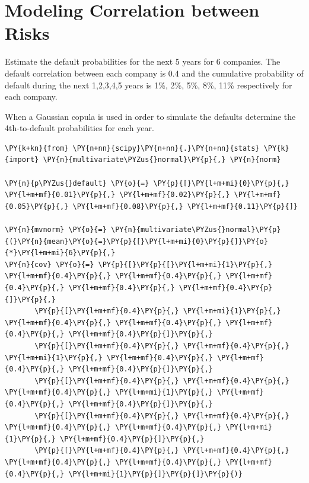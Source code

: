 \chapter{Modeling Correlation between Risks}\label{introduction-to-python---lesson-12}

\begin{Exercise}[title={($n^{th}$ to Default)}]
Estimate the default probabilities for the next 5 years for 6 companies. 
The default correlation between each company is 0.4 and the cumulative probability of default during 
the next 1,2,3,4,5 years is 1\%, 2\%, 5\%, 8\%, 11\% respectively for each company.

When a Gaussian copula is used in order to simulate the defaults determine the 4th-to-default probabilities for each year.
\end{Exercise}
\begin{Answer}
\begin{tcolorbox}[breakable, size=fbox, boxrule=1pt, pad at break*=1mm,colback=cellbackground, colframe=cellborder]
\begin{Verbatim}[commandchars=\\\{\}]
\PY{k+kn}{from} \PY{n+nn}{scipy}\PY{n+nn}{.}\PY{n+nn}{stats} \PY{k}{import} \PY{n}{multivariate\PYZus{}normal}\PY{p}{,} \PY{n}{norm}
	
\PY{n}{p\PYZus{}default} \PY{o}{=} \PY{p}{[}\PY{l+m+mi}{0}\PY{p}{,} \PY{l+m+mf}{0.01}\PY{p}{,} \PY{l+m+mf}{0.02}\PY{p}{,} \PY{l+m+mf}{0.05}\PY{p}{,} \PY{l+m+mf}{0.08}\PY{p}{,} \PY{l+m+mf}{0.11}\PY{p}{]}
	
\PY{n}{mvnorm} \PY{o}{=} \PY{n}{multivariate\PYZus{}normal}\PY{p}{(}\PY{n}{mean}\PY{o}{=}\PY{p}{[}\PY{l+m+mi}{0}\PY{p}{]}\PY{o}{*}\PY{l+m+mi}{6}\PY{p}{,}
\PY{n}{cov} \PY{o}{=} \PY{p}{[}\PY{p}{[}\PY{l+m+mi}{1}\PY{p}{,} \PY{l+m+mf}{0.4}\PY{p}{,} \PY{l+m+mf}{0.4}\PY{p}{,} \PY{l+m+mf}{0.4}\PY{p}{,} \PY{l+m+mf}{0.4}\PY{p}{,} \PY{l+m+mf}{0.4}\PY{p}{]}\PY{p}{,}
       \PY{p}{[}\PY{l+m+mf}{0.4}\PY{p}{,} \PY{l+m+mi}{1}\PY{p}{,} \PY{l+m+mf}{0.4}\PY{p}{,} \PY{l+m+mf}{0.4}\PY{p}{,} \PY{l+m+mf}{0.4}\PY{p}{,} \PY{l+m+mf}{0.4}\PY{p}{]}\PY{p}{,}
       \PY{p}{[}\PY{l+m+mf}{0.4}\PY{p}{,} \PY{l+m+mf}{0.4}\PY{p}{,} \PY{l+m+mi}{1}\PY{p}{,} \PY{l+m+mf}{0.4}\PY{p}{,} \PY{l+m+mf}{0.4}\PY{p}{,} \PY{l+m+mf}{0.4}\PY{p}{]}\PY{p}{,}
       \PY{p}{[}\PY{l+m+mf}{0.4}\PY{p}{,} \PY{l+m+mf}{0.4}\PY{p}{,} \PY{l+m+mf}{0.4}\PY{p}{,} \PY{l+m+mi}{1}\PY{p}{,} \PY{l+m+mf}{0.4}\PY{p}{,} \PY{l+m+mf}{0.4}\PY{p}{]}\PY{p}{,}
       \PY{p}{[}\PY{l+m+mf}{0.4}\PY{p}{,} \PY{l+m+mf}{0.4}\PY{p}{,} \PY{l+m+mf}{0.4}\PY{p}{,} \PY{l+m+mf}{0.4}\PY{p}{,} \PY{l+m+mi}{1}\PY{p}{,} \PY{l+m+mf}{0.4}\PY{p}{]}\PY{p}{,}
       \PY{p}{[}\PY{l+m+mf}{0.4}\PY{p}{,} \PY{l+m+mf}{0.4}\PY{p}{,} \PY{l+m+mf}{0.4}\PY{p}{,} \PY{l+m+mf}{0.4}\PY{p}{,} \PY{l+m+mf}{0.4}\PY{p}{,} \PY{l+m+mi}{1}\PY{p}{]}\PY{p}{]}\PY{p}{)}
	

\end{Verbatim}
\end{tcolorbox}
\end{Answer}
